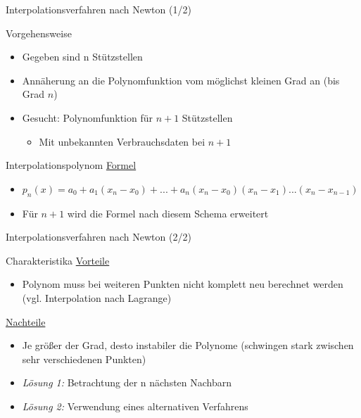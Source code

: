 \begin{frame}{Interpolationsverfahren nach Newton (1/2)}
\begin{block}{Vorgehensweise}
\begin{itemize}
\item Gegeben sind n Stützstellen
\item Annäherung an die Polynomfunktion vom möglichst kleinen Grad an (bis Grad $n$)
\item Gesucht: Polynomfunktion für $n+1$ Stützstellen
\begin{itemize}
\item Mit unbekannten Verbrauchsdaten bei $n+1$
\end{itemize}
\end{itemize}
\end{block}
\begin{block} {Interpolationspolynom}
\underline{Formel}
\begin{itemize}
\item $p_n(x) = a_0+a_1(x_n-x_0)+...+a_n(x_n-x_0)(x_n-x_1)...(x_n-x_{n-1})$
\item Für $n+1$ wird die Formel nach diesem Schema erweitert
\end{itemize}
\end{block}
\end{frame}

\begin{frame}{Interpolationsverfahren nach Newton (2/2)}
\begin{block} {Charakteristika}
\underline{Vorteile}
\begin{itemize}
\item Polynom muss bei weiteren Punkten nicht komplett neu berechnet werden (vgl. Interpolation nach Lagrange)
\end{itemize}
\underline{Nachteile}
\begin{itemize}
\item Je größer der Grad, desto instabiler die Polynome (schwingen stark zwischen sehr verschiedenen Punkten)
\item \textit{Lösung 1:} Betrachtung der n nächsten Nachbarn
\item \textit{Lösung 2:} Verwendung eines alternativen Verfahrens
\end{itemize}
\end{block}
\end{frame}

